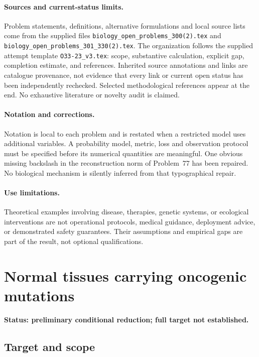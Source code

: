 \documentclass[11pt]{article}
\begin{document}
\paragraph{Sources and current-status limits.}
Problem statements, definitions, alternative formulations and local source lists
come from the supplied files
\texttt{biology\_open\_problems\_300(2).tex} and
\texttt{biology\_open\_problems\_301\_330(2).tex}.
The organization follows the supplied attempt template
\texttt{O33-23\_v3.tex}: scope, substantive calculation, explicit gap,
completion estimate, and references. Inherited source annotations and links are
catalogue provenance, not evidence that every link or current open status has
been independently rechecked. Selected methodological references appear at the
end. No exhaustive literature or novelty audit is claimed.

\paragraph{Notation and corrections.}
Notation is local to each problem and is restated when a restricted model uses
additional variables. A probability model, metric, loss and observation protocol
must be specified before its numerical quantities are meaningful. One obvious
missing backslash in the reconstruction norm of Problem~77 has been repaired.
No biological mechanism is silently inferred from that typographical repair.

\paragraph{Use limitations.}
Theoretical examples involving disease, therapies, genetic systems, or ecological
interventions are not operational protocols, medical guidance, deployment advice,
or demonstrated safety guarantees. Their assumptions and empirical gaps are part
of the result, not optional qualifications.


\section*{Normal tissues carrying oncogenic mutations}
\label{prob:250}
\noindent\textbf{Status: preliminary conditional reduction; full target not established.}
\subsection{Target and scope}
\end{document}
